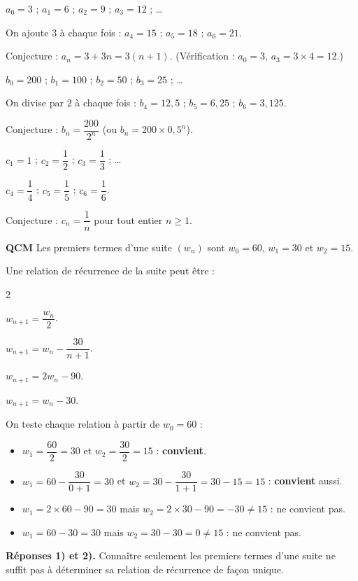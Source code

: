 \documentclass[12pt,a4paper]{book}
\begin{document}
\begin{enumMet}
	\item $a_0=3$ ; $a_1=6$ ; $a_2=9$ ; $a_3=12$ ; \dots

	\begin{corrBox}
		On ajoute $3$ à chaque fois : $a_4=15$ ; $a_5=18$ ; $a_6=21$.

		Conjecture : $a_n=3+3n=3(n+1)$. \quad (Vérification : $a_0=3$, $a_3=3\times 4=12$.)
	\end{corrBox}
	\item $b_0=200$ ; $b_1=100$ ; $b_2=50$ ; $b_3=25$ ; \dots

	\begin{corrBox}
		On divise par $2$ à chaque fois : $b_4=12,5$ ; $b_5=6,25$ ; $b_6=3,125$.

		Conjecture : $b_n=\dfrac{200}{2^n}$ \quad (ou $b_n=200\times 0,5^n$).
	\end{corrBox}
	\item $c_1=1$ ; $c_2=\dfrac{1}{2}$ ; $c_3=\dfrac{1}{3}$ ; \dots

	\begin{corrBox}
		$c_4=\dfrac{1}{4}$ ; $c_5=\dfrac{1}{5}$ ; $c_6=\dfrac{1}{6}$.

		Conjecture : $c_n=\dfrac{1}{n}$ pour tout entier $n\geqslant 1$.
	\end{corrBox}
\end{enumMet}

\exerciceDS{}

\textbf{QCM} Les premiers termes d'une suite $(w_n)$ sont $w_0=60$, $w_1=30$ et $w_2=15$.

Une relation de récurrence de la suite peut être :
\begin{multicols}{2}
\begin{enumMet}
	\item $w_{n+1}=\dfrac{w_n}{2}$.
	\item $w_{n+1}=w_n-\dfrac{30}{n+1}$.
	\item $w_{n+1}=2w_n-90$.
	\item $w_{n+1}=w_n-30$.
\end{enumMet}
\end{multicols}

\begin{corrBox}
	On teste chaque relation à partir de $w_0=60$ :
	\begin{itemize}
		\item[1)] $w_1=\dfrac{60}{2}=30$ et $w_2=\dfrac{30}{2}=15$ : \textbf{convient}.
		\item[2)] $w_1=60-\dfrac{30}{0+1}=30$ et $w_2=30-\dfrac{30}{1+1}=30-15=15$ : \textbf{convient} aussi.
		\item[3)] $w_1=2\times 60-90=30$ mais $w_2=2\times 30-90=-30\neq 15$ : ne convient pas.
		\item[4)] $w_1=60-30=30$ mais $w_2=30-30=0\neq 15$ : ne convient pas.
	\end{itemize}
	\textbf{Réponses 1) et 2).} Connaître seulement les premiers termes d'une suite ne suffit pas à déterminer sa relation de récurrence de façon unique.
\end{corrBox}
\end{document}
